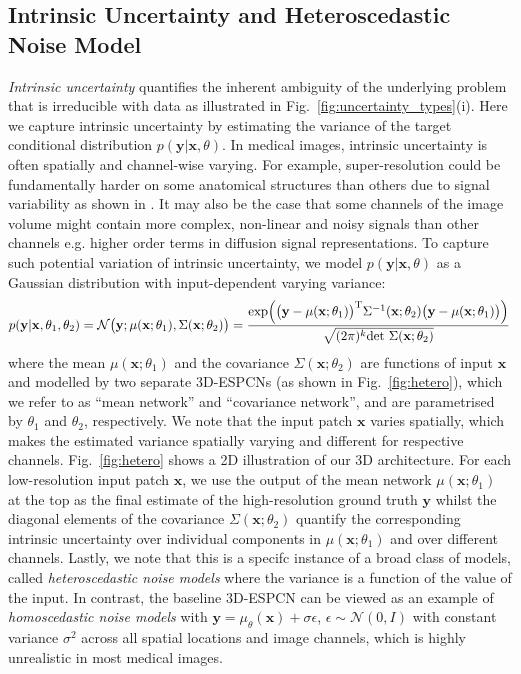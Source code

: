 \subsection{Intrinsic Uncertainty and Heteroscedastic Noise Model \label{sec:hetero}} 
\textit{Intrinsic uncertainty} quantifies the inherent ambiguity of the underlying problem that is irreducible with data as illustrated in Fig.~\ref{fig:uncertainty_types}(i). Here we capture intrinsic uncertainty by estimating the variance of the target conditional distribution $p(\mathbf{y}|\mathbf{x}, \theta)$. In medical images, intrinsic uncertainty is often spatially and channel-wise varying. For example, super-resolution could be fundamentally harder on some anatomical structures than others due to signal variability as shown in \cite{tanno2016bayesian}. It may also be the case that some channels of the image volume might contain more complex, non-linear and noisy signals than other channels e.g. higher order terms in diffusion signal representations. To capture such potential variation of intrinsic uncertainty, we model $p(\mathbf{y}|\mathbf{x}, \theta)$ as a Gaussian distribution with input-dependent varying variance: 
\begin{equation}\label{eq:hetero_pdf}
p(\mathbf{y}|\mathbf{x},\mathbf{\theta}_1, \mathbf{\theta}_2) = \mathcal{N}\big{(}\mathbf{y}; \mu(\mathbf{x};\mathbf{\theta}_1),\Sigma(\mathbf{x};\theta_2)\big{)} = \frac{\text{exp} \Big{(} \big{(}\mathbf{y}-\mu(\mathbf{x};\theta_1)\big{)}^\text{T}\Sigma^{-1}(\mathbf{x};\theta_2)\big{(}\mathbf{y}-\mu(\mathbf{x};\theta_1)\big{)}\Big{)}}{\sqrt{(2\pi)^{k} \text{det }\Sigma( \mathbf{x};\theta_2)} }
\end{equation}
 where the mean $\mu(\mathbf{x};\theta_1)$ and the covariance $\Sigma(\mathbf{x};\theta_2)$ are functions of input $\mathbf{x}$ and modelled by two separate 3D-ESPCNs (as shown in 
 Fig.~\ref{fig:hetero}), which we refer to as ``mean network'' and ``covariance network'', and are parametrised by $\theta_1$ and $\theta_2$, respectively. We note that the input patch $\mathbf{x}$ varies spatially, which makes the estimated variance spatially varying and different for respective channels. Fig.~\ref{fig:hetero} shows a 2D illustration of our 3D architecture. For each low-resolution input patch $\mathbf{x}$, we use the output of the mean network $\mu(\mathbf{x};\theta_1)$ at the top as the final estimate of the high-resolution ground truth $\mathbf{y}$ whilst the diagonal elements of the covariance $\Sigma(\mathbf{x};\theta_2)$ quantify the corresponding intrinsic uncertainty over individual components in $\mu(\mathbf{x};\theta_1)$ and over different channels. Lastly, we note that this is a specifc instance of a broad class of models, called \textit{heteroscedastic noise models} \cite{rao1970estimation,nix1994estimating} where the variance  is a function of the value of the input. In contrast, the baseline 3D-ESPCN can be viewed as an example of \textit{homoscedastic noise models} with $\mathbf{y} = \mu_{\theta}(\mathbf{x}) + \sigma \epsilon$, $\epsilon \sim \mathcal{N}(0, I)$ with constant variance $ \sigma^2$ across all spatial locations and image channels, which is highly unrealistic in most medical images. 
 

